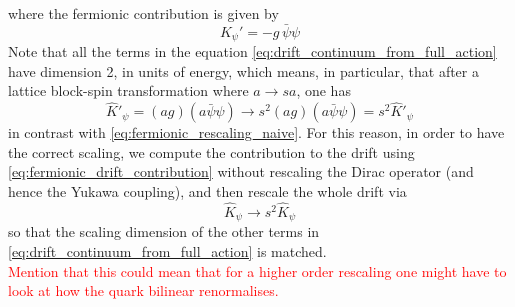 where the fermionic contribution is given by
\begin{equation*}
    K_{\psi}' = - g \, \bar\psi\psi
\end{equation*}
Note that all the terms in the equation \eqref{eq:drift_continuum_from_full_action} have dimension 2, in units of energy, which means, in particular, that after a lattice block-spin transformation where $a \to sa$, one has
\begin{equation}
    \widehat{K}'_\psi = (ag) (a\bar\psi \psi) \to s^2 (ag) (a\bar\psi \psi) = s^2 \widehat{K}'_\psi
    \label{eq:rescaling_blinear}
\end{equation}
in contrast with \eqref{eq:fermionic_rescaling_naive}. For this reason, in order to have the correct scaling, we compute the contribution to the drift using \eqref{eq:fermionic_drift_contribution} without rescaling the Dirac operator (and hence the Yukawa coupling), and then rescale the whole drift via 
\begin{equation*}
    \widehat{K}_\psi \to s^2 \widehat{K}_\psi
\end{equation*}
so that the scaling dimension of the other terms in \eqref{eq:drift_continuum_from_full_action} is matched. \\
\textcolor{red}{Mention that this could mean that for a higher order rescaling one might have to look at how the quark bilinear renormalises.}

\newpage 